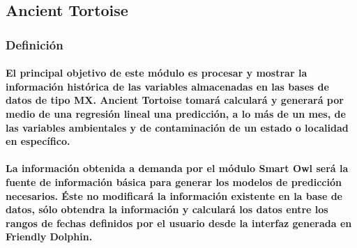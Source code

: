   \subsection{Ancient Tortoise}
    \subsubsection{Definición}
      \paragraph{El principal objetivo de este módulo es procesar y mostrar la información histórica de las variables almacenadas en las bases de datos de tipo MX. Ancient Tortoise tomará calculará y generará por medio de una regresión lineal una predicción, a lo más de un mes, de las variables ambientales y de contaminación de un estado o localidad en específico.}
      \paragraph{La información obtenida a demanda por el módulo Smart Owl será la fuente de información básica para generar los modelos de predicción necesarios. Éste no modificará la información existente en la base de datos, sólo obtendra la información y calculará los datos entre los rangos de fechas definidos por el usuario desde la interfaz generada en Friendly Dolphin.}
